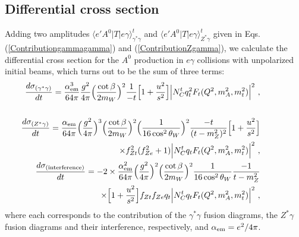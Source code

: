 \documentclass[final,5p,times,twocolumn]{elsarticle}
\newcommand{\bea}{\begin{eqnarray}}
\newcommand{\eea}{\end{eqnarray}}
\newcommand{\nn}{\nonumber}
\begin{document}
\subsection{Differential cross section}
Adding two amplitudes $\langle e' A^0|T|e\gamma\rangle^t_{\gamma^*\gamma}$ and $\langle e' A^0|T|e\gamma\rangle^t_{Z^*\gamma}$ given in Eqs.(\ref{Contributiongammagamma}) and (\ref{ContributionZgamma}), we calculate
the differential cross section for the $A^0$ production   
in $e\gamma$ collisions with unpolarized initial beams, which turns out to be the sum of three terms:
\bea
&&\hspace{-1.5cm}\frac{d\sigma_{(\gamma^*\gamma)}}{dt}=\frac{\alpha_{\rm em}^3}{64\pi}
\frac{g^2}{4\pi}\Bigl(\frac{\cot\beta}{2m_W}\Bigr)^2\frac{1}{-t}\Bigl[1+\frac{u^2}{s^2}\Bigr]
\Bigl|N^t_Cq_t^2F_t(Q^2,m_A^2, m_t^2)\Bigr|^2~,\label{gamma-gamma-cross}\nn\\
&&\\
&&\hspace{-1.5cm}\frac{d\sigma_{(Z^*\gamma)}}{dt}=\frac{\alpha_{\rm em}}{64\pi}
\Bigl(\frac{g^2}{4\pi}\Bigr)^3\Bigl(\frac{\cot\beta}{2m_W}\Bigr)^2\Bigl( \frac{1}{16\cos^2\theta_W} \Bigr)^2\frac{-t}{(t-m_Z^2)^2}\Bigl[1+\frac{u^2}{s^2}\Bigr]
\nn\\
&&  \times f_{Zt}^2(f_{Ze}^2+1) \Bigl|N^t_Cq_tF_t(Q^2,m_A^2, m_t^2)\Bigr|^2~,\label{Z-gamma-cross}\\
&&\hspace{-1.5cm}\frac{d\sigma_{(\rm interference)}}{dt}=-2\times \frac{\alpha^2_{\rm em}}{64\pi}
\Bigl(\frac{g^2}{4\pi}\Bigr)^2\Bigl(\frac{\cot\beta}{2m_W}\Bigr)^2 \frac{1}{16\cos^2\theta_W} \frac{-1}{t-m_Z^2}\nn\\
&&\times \Bigl[1+\frac{u^2}{s^2}\Bigr] f_{Zt} f_{Ze}q_t \Bigl|N^t_Cq_tF_t(Q^2,m_A^2, m_t^2)\Bigr|^2~,\label{interference-cross}
\eea
where each corresponds to the contribution of the $\gamma^* \gamma$ fusion diagrams, 
the  $Z^* \gamma$ fusion diagrams and their interference, respectively, and
$\alpha_{\rm em}=e^2/4\pi$. 

\end{document}
